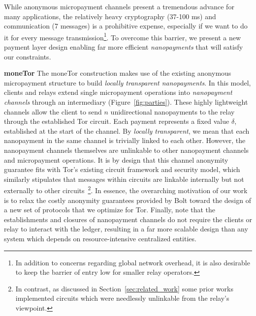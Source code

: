 While anonymous micropayment channels present a tremendous advance for many applications, the relatively heavy cryptography (37-100 ms) and communication (7 messages) is a prohibitive expense, especially if we want to do it for every message transmission\footnote{In addition to concerns regarding global network overhead, it is also desirable to keep the barrier of entry low for smaller relay operators.}.
To overcome this barrier, we present a new payment layer design enabling far more efficient \emph{nanopayments} that will satisfy our constraints.

\medskip \noindent\textbf{moneTor} The moneTor construction makes use of the existing anonymous micropayment structure to build \emph{locally transparent nanopayments}.
In this model, clients and relays extend single micropayment operations into \emph{nanopayment channels} through an intermediary (Figure~\ref{fig:parties}).
These highly lightweight channels allow the client to send $n$ unidirectional nanopayments to the relay through the established Tor circuit.
Each payment represents a fixed value $\delta$, established at the start of the channel.
By \emph{locally transparent}, we mean that each nanopayment in the same channel is trivially linked to each other.
However, the nanopayment channels themselves are unlinkable to other nanopayment channels and micropayment operations.
It is by design that this channel anonymity guarantee fits with Tor's existing circuit framework and security model, which similarly stipulates that messages within circuits are linkable internally but not externally to other circuits~\footnote{In contrast, as discussed in Section~\ref{sec:related_work} some prior works implemented circuits which were needlessly unlinkable from the relay's viewpoint.}.
In essence, the overarching motivation of our work is to relax the costly anonymity guarantees provided by Bolt toward the design of a new set of protocols that we optimize for Tor.
Finally, note that the establishments and closures of nanopayment channels do not require the clients or relay to interact with the ledger, resulting in a far more scalable design than any system which depends on resource-intensive centralized entities.

